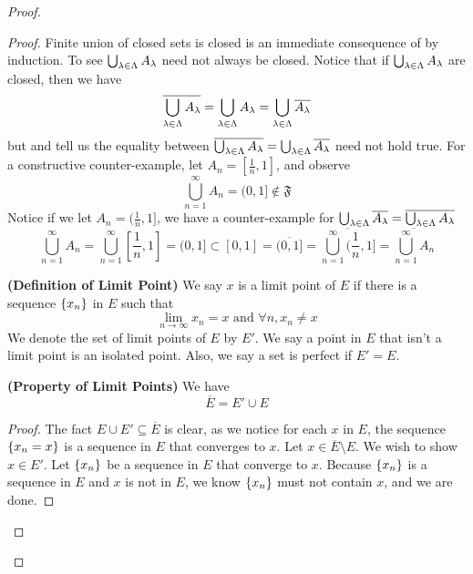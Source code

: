 \documentclass{report}
\begin{document}
\begin{proof}
\begin{proof}
Finite union of closed sets is closed is an immediate consequence of  by induction. To see $\bigcup_{\lambda \in \Lambda }A_\lambda $ need not always be closed. Notice that if $\bigcup _{\lambda \in\Lambda }A_\lambda$ are closed, then we have
 \begin{equation}
   \overline{\bigcup_{\lambda \in \Lambda }A_\lambda}=\bigcup_{\lambda \in\Lambda }A_\lambda=\bigcup_{\lambda \in\Lambda }\overline{A_\lambda }
\end{equation}
but  and  tell us the equality between $\overline{\bigcup_{\lambda \in\Lambda }A_\lambda }=\bigcup_{\lambda \in \Lambda }\overline{A_\lambda }$ need not hold true. For a constructive counter-example, let $A_n=[\frac{1}{n},1]$, and observe
\begin{equation}
  \bigcup_{n=1}^\infty A_n=(0,1]\not\in \mathfrak{F}
\end{equation}
Notice if we let $A_n=(\frac{1}{n},1]$, we have a counter-example for $\bigcup_{\lambda \in \Lambda }\overline{A_\lambda }=\overline{\bigcup _{\lambda \in\Lambda }A_\lambda }$
\begin{equation}
  \bigcup_{n=1}^\infty A_n=\bigcup_{n=1}^\infty [\frac{1}{n},1]=(0,1]\subset [0,1]=\overline{(0,1]}=\overline{\bigcup_{n=1}^\infty(\frac{1}{n},1]}=\overline{\bigcup _{n=1}^\infty A_n}
\end{equation}
\begin{definition}
\label{3.2.6}
\textbf{(Definition of Limit Point)} We say $x$ is a limit point of  $E$ if there is a sequence $\{ x_n \}$ in $E$ such that
\begin{equation}
\lim_{n\to\infty} x_n=x\text{ and }\forall n, x_n\neq x
\end{equation}
We denote the set of limit points of $E$ by  $E'$. We say a point in $E$ that isn't a limit point is an isolated point. Also, we say a set is perfect if $E'=E$. 
\end{definition}
\begin{theorem}
\label{3.2.7}
\textbf{(Property of Limit Points)} We have
\begin{equation}
\overline{E}=E'\cup E
\end{equation}
\end{theorem}
\begin{proof}
The fact $E\cup E'\subseteq \overline{E}$ is clear, as we notice for each $x$ in $E$, the sequence $\{ x_n=x \}$ is a sequence in $E$ that converges to $x$. Let $x\in \overline{E}\setminus E$. We wish to show $x\in E'$. Let $\{ x_n \}$ be a sequence in $E$ that converge to  $x$. Because $\{ x_n \}$ is a sequence in $E$ and $x$ is not in $E$, we know  $\{ x_n \}$ must not contain $x$, and we are done.

\end{proof}
\end{proof}
\end{proof}
\end{document}
